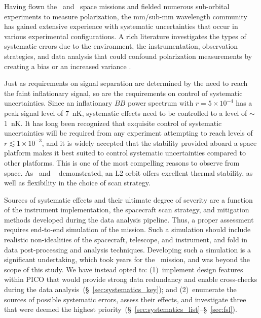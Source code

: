 \documentclass[PICOReport.tex]{subfiles}
\begin{document}
Having flown the \wmap\ and \planck\ space missions and fielded numerous sub-orbital experiments to measure polarization, the mm/sub-mm wavelength community has gained extensive experience with systematic uncertainties that occur in various experimental configurations. A rich literature investigates the types of systematic errors due to the environment, the instrumentation, observation strategies, and data analysis that could confound polarization measurements by creating a bias or an increased variance \cite{hu03,shimon2008,yadav2010,Griffiths2014,LFI_systematics,Kaplan2002,Miller2009,Pagano2009,SO_sys_optical,SO_sys_detector, bicep_systematics,SPIDER_systematics}.%

Just as requirements on signal separation %
are determined by the need to reach the faint inflationary signal, so are the requirements on control of systematic uncertainties. Since an inflationary $BB$ power spectrum with $r = 5 \times 10^{-4}$ has a peak signal level of 7~nK, systematic effects need to be controlled to a level of $\sim$1~nK. It has long been recognized that exquisite control of systematic uncertainties will be required from any experiment attempting to reach levels of $r \lesssim 1\times 10^{-3}$, and it is widely accepted that the stability provided aboard a space platform makes it best suited to control systematic uncertainties compared to other platforms. This is one of the most compelling reasons to observe from space.  As \wmap\ and \planck~ demonstrated, an L2 orbit offers excellent thermal stability, as well as flexibility in the choice of scan strategy.  

Sources of systematic effects and their ultimate degree of severity are a function of the instrument implementation, the spacecraft scan strategy, and mitigation methods developed during the data analysis pipeline. Thus, a proper assessment requires end-to-end simulation of the mission. Such a simulation should include realistic non-idealities of the spacecraft, telescope, and instrument, and fold in data post-processing and analysis techniques. Developing such a simulation is a significant undertaking, which took years  for the \planck\ mission, and was beyond the scope of this study. We have instead opted to: (1)~implement design features within PICO that would provide strong data redundancy and enable cross-checks during the data analysis~(\S~\ref{sec:systematics_key}); and (2)~enumerate the sources of possible systematic errors, assess their effects, and investigate three that were deemed the highest priority~(\S~\ref{sec:systematics_list}--\S~\ref{sec:fsl}). 
\end{document}

